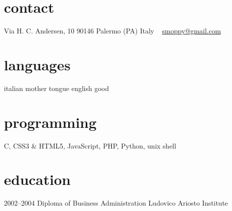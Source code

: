 \documentclass[]{friggeri-cv} %
\begin{document}


\begin{aside} %
\section{contact}
Via H. C. Andersen, 10
90146 Palermo (PA)
Italy
~
\href{mailto:smoppy@gmail.com}{smoppy@gmail.com}
\section{languages}
italian mother tongue
english good
\section{programming}
C, CSS3 \& HTML5,
JavaScript, PHP, Python, unix shell
\end{aside}

\section{education}
\begin{entrylist}
\entry
{2002--2004}
{Diploma {\normalfont of Business Administration}}
{Ludovico Ariosto Institute}
{}
\end{entrylist}

\end{document}

